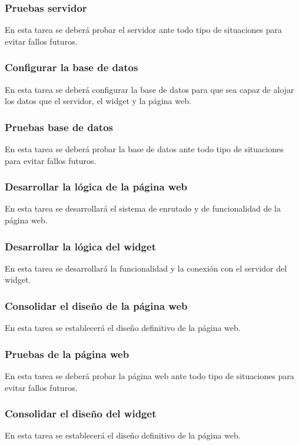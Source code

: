 \subsubsection{Pruebas servidor}
En esta tarea se deberá probar el servidor ante todo tipo de situaciones para evitar fallos futuros.

\subsubsection{Configurar la base de datos}
En esta tarea se deberá configurar la base de datos para que sea capaz de alojar los datos que el servidor, el widget y la página web.

\subsubsection{Pruebas base de datos}
En esta tarea se deberá probar la base de datos ante todo tipo de situaciones para evitar fallos futuros.

\subsubsection{Desarrollar la lógica de la página web}
En esta tarea se desarrollará el sistema de enrutado y de funcionalidad de la página web.

\subsubsection{Desarrollar la lógica del widget}
En esta tarea se desarrollará la funcionalidad y la conexión con el servidor del widget.

\subsubsection{Consolidar el diseño de la página web}
En esta tarea se establecerá el diseño definitivo de la página web.

\subsubsection{Pruebas de la página web}
En esta tarea se deberá probar la página web ante todo tipo de situaciones para evitar fallos futuros.

\subsubsection{Consolidar el diseño del widget}
En esta tarea se establecerá el diseño definitivo de la página web.

